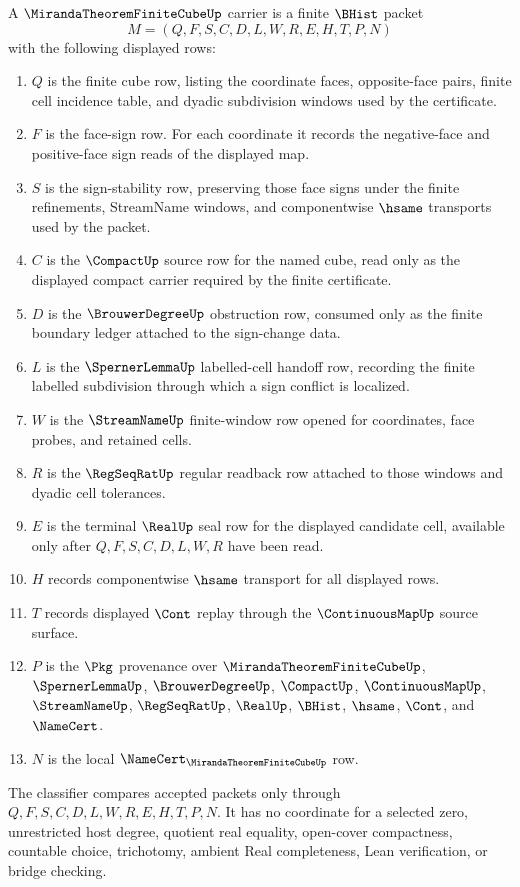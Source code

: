 \begin{definition}
\label{def:miranda-theorem-finite-cube-carrier}
A $\MirandaTheoremFiniteCubeUp$ carrier is a finite $\BHist$ packet
$$
M=(Q,F,S,C,D,L,W,R,E,H,T,P,N)
$$
with the following displayed rows:
\begin{enumerate}
\item $Q$ is the finite cube row, listing the coordinate faces, opposite-face pairs, finite cell incidence table, and dyadic subdivision windows used by the certificate.
\item $F$ is the face-sign row. For each coordinate it records the negative-face and positive-face sign reads of the displayed map.
\item $S$ is the sign-stability row, preserving those face signs under the finite refinements, StreamName windows, and componentwise $\hsame$ transports used by the packet.
\item $C$ is the $\CompactUp$ source row for the named cube, read only as the displayed compact carrier required by the finite certificate.
\item $D$ is the $\BrouwerDegreeUp$ obstruction row, consumed only as the finite boundary ledger attached to the sign-change data.
\item $L$ is the $\SpernerLemmaUp$ labelled-cell handoff row, recording the finite labelled subdivision through which a sign conflict is localized.
\item $W$ is the $\StreamNameUp$ finite-window row opened for coordinates, face probes, and retained cells.
\item $R$ is the $\RegSeqRatUp$ regular readback row attached to those windows and dyadic cell tolerances.
\item $E$ is the terminal $\RealUp$ seal row for the displayed candidate cell, available only after $Q,F,S,C,D,L,W,R$ have been read.
\item $H$ records componentwise $\hsame$ transport for all displayed rows.
\item $T$ records displayed $\Cont$ replay through the $\ContinuousMapUp$ source surface.
\item $P$ is the $\Pkg$ provenance over $\MirandaTheoremFiniteCubeUp$, $\SpernerLemmaUp$, $\BrouwerDegreeUp$, $\CompactUp$, $\ContinuousMapUp$, $\StreamNameUp$, $\RegSeqRatUp$, $\RealUp$, $\BHist$, $\hsame$, $\Cont$, and $\NameCert$.
\item $N$ is the local $\NameCert_{\MirandaTheoremFiniteCubeUp}$ row.
\end{enumerate}
The classifier compares accepted packets only through $Q,F,S,C,D,L,W,R,E,H,T,P,N$. It has no coordinate for a selected zero, unrestricted host degree, quotient real equality, open-cover compactness, countable choice, trichotomy, ambient Real completeness, Lean verification, or bridge checking.
\end{definition}

